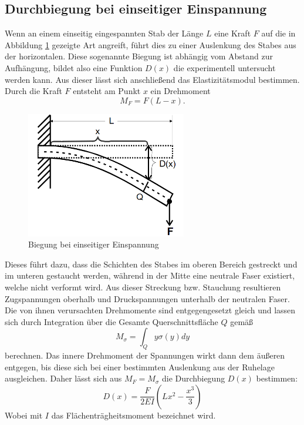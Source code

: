 \subsection{Durchbiegung bei einseitiger Einspannung}
Wenn an einem einseitig eingespannten Stab der Länge $L$ eine Kraft $F$ auf die in Abbildung \ref{fig:einseitig} gezeigte Art angreift, führt dies zu einer Auslenkung des Stabes
aus der horizontalen. Diese sogenannte Biegung ist abhängig vom Abstand zur Aufhängung, bildet also eine Funktion $D(x)$ die experimentell untersucht werden kann. 
Aus dieser lässt sich anschließend das Elastizitätsmodul bestimmen. Durch die Kraft $F$ entsteht am Punkt $x$ ein Drehmoment 
\begin{equation*}
M_F=F(L-x).
\end{equation*}
\begin{figure}
\centering
\includegraphics[width=7cm, keepaspectratio]{Biegung einseitig}
\caption{Biegung bei einseitiger Einspannung}
\label{fig:einseitig}
\end{figure}
Dieses führt dazu, dass die Schichten des Stabes im oberen Bereich gestreckt und im unteren gestaucht werden, während in der Mitte eine neutrale Faser existiert,
welche nicht verformt wird. Aus dieser Streckung bzw. Stauchung resultieren Zugspannungen oberhalb und Druckspannungen unterhalb der neutralen Faser.
Die von ihnen verursachten Drehmomente sind entgegengesetzt gleich und lassen sich durch Integration über die Gesamte Querschnittsfläche $Q$ gemäß
\begin{equation*}
M_{\sigma}=\int_{Q} y\sigma (y) dy
\end{equation*}
berechnen. Das innere Drehmoment der Spannungen wirkt dann dem äußeren entgegen, bis diese sich bei einer bestimmten Auslenkung aus der Ruhelage ausgleichen. Daher lässt sich aus $M_F=M_{\sigma}$ die Durchbiegung 
$D(x)$ bestimmen:
\begin{equation}
D(x)=\frac{F}{2EI}(Lx^2-\frac{x^3}{3})
\end{equation}
Wobei mit $I$ das Flächenträgheitsmoment bezeichnet wird. \\
